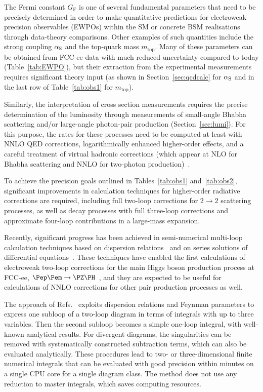 The Fermi constant $G_\mathrm{F}$ is one of several fundamental parameters that need to be precisely determined 
in order to make quantitative predictions for electroweak precision observables (\mbox{EWPOs}) 
within the SM or concrete BSM realisations through data-theory comparisons. 
Other examples of such quantities include the strong coupling $\alpha_{\rm S}$ and the top-quark mass $m_\text{top}$. 
Many of these parameters can be obtained from FCC-ee data with much reduced uncertainty compared to today (Table~\ref{tab:EWPO}), 
but their extraction from the experimental measurements requires significant theory input 
(as shown in Section~\ref{sec:qcdcalc} for $\alpha_{\rm S}$ and in the last row of Table~\ref{tab:obs1} for $m_\text{top}$).

Similarly, the interpretation of cross section measurements requires the precise determination of the luminosity 
through measurements of small-angle Bhabha scattering and/or large-angle photon-pair production (Section~\ref{sec:lumi}). 
For this purpose, the rates for these processes need to be computed at least with NNLO QED corrections, 
logarithmically enhanced higher-order effects, and a careful treatment of virtual hadronic corrections 
(which appear at NLO for Bhabha scattering and NNLO for two-photon production)~\cite{deBlas:2024bmz,Jadach:2018jjo}.

To achieve the precision goals outlined in Tables~\ref{tab:obs1} and~\ref{tab:obs2}, 
significant improvements in calculation techniques for higher-order radiative corrections are required, 
including full two-loop corrections for $2\to 2$ scattering processes, 
as well as decay processes with full three-loop corrections and approximate four-loop contributions in a large-mass expansion.

Recently, significant progress has been achieved in semi-numerical multi-loop calculation techniques based on dispersion relations~\cite{Song:2021vru,Freitas:2022hyp} 
and on series solutions of differential equations~\cite{Dubovyk:2022frj,Liu:2021wks,Liu:2022mfb,Liu:2022chg,Hidding:2022ycg,Armadillo:2022ugh}. 
These techniques have enabled the first calculations of electroweak two-loop corrections for the main Higgs boson production process at FCC-ee, 
$\epem \to \PZ\PH$~\cite{Freitas:2022hyp,Chen:2022mre}, 
and they are expected to be useful for calculations of NNLO corrections for other pair production processes as well.

The approach of Refs.~\cite{Song:2021vru,Freitas:2022hyp} exploits dispersion relations and Feynman parameters 
to express one subloop of a two-loop diagram in terms of integrals with up to three variables. 
Then the second subloop becomes a simple one-loop integral, with well-known analytical results. 
For divergent diagrams, the singularities can be removed with systematically constructed subtraction terms, which can also be evaluated analytically. 
These procedures lead to two- or three-dimensional finite numerical integrals that can be evaluated with good precision 
within minutes on a single CPU core for a single diagram class. 
The method does not use any reduction to master integrals, which saves computing resources.


